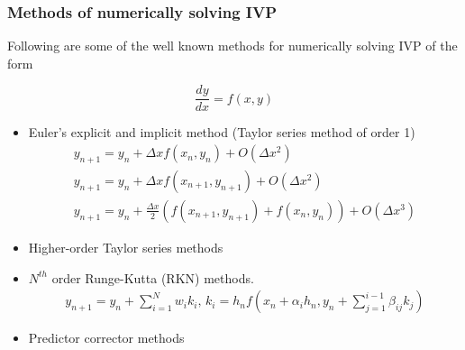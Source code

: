 \documentclass{beamer}
\begin{document}
\begin{frame}
	\frametitle{Methods of numerically solving IVP}
	
	Following are some of the well known methods for numerically solving IVP of the form
	
	\begin{equation}
	 \frac{d y}{dx} = f(x,y)
	\end{equation} 
	
	\begin{itemize}
		\item Euler's explicit and implicit method (Taylor series method of order 1) 
		\begin{eqnarray}
			y_{n+1} = y_{n} + \Delta x f(x_{n}, y_{n}) + O(\Delta x^2)\\
			y_{n+1} = y_{n} + \Delta x f(x_{n+1}, y_{n+1}) + O(\Delta x^2)\\
			y_{n+1} = y_{n} + \frac{\Delta x}{2} \left(  f(x_{n+1}, y_{n+1}) + f(x_{n}, y_{n})\right) + O(\Delta x^3)
		\end{eqnarray}
		\item Higher-order Taylor series methods
		\item $N^{th}$ order Runge-Kutta (RKN) methods.
		\begin{eqnarray}
		y_{n+1} = y_n +  \sum_{i=1}^{N}  w_i k_i\text{,      }  k_i  = h_n f \left( x_n + \alpha_i h_n, y_n + \sum_{j=1}^{i-1} \beta_{ij}k_j  \right)   
		\end{eqnarray}
		\item Predictor corrector methods
	\end{itemize}	
\end{frame}
\end{document}
